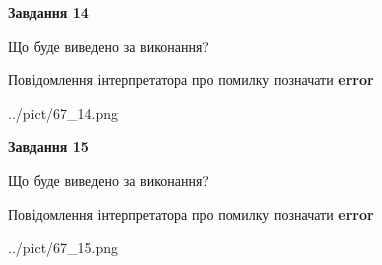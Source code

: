 \documentclass[11pt, ukrainian]{article}
\begin{document}
{\begin {large}
{\begin {center}\textbf{Завдання 14}\end {center}}\par
Що буде виведено за виконання? \par
Повідомлення інтерпретатора про помилку позначати \textbf{error}

\begin{center}
	{../pict/67_14.png}
\end{center}
\newpage

{\begin {center}\textbf{Завдання 15}\end {center}}\par
Що буде виведено за виконання? \par
Повідомлення інтерпретатора про помилку позначати \textbf{error}

\begin{center}
	{../pict/67_15.png}
\end{center}
\newpage

\end {large}}
\end{document}
